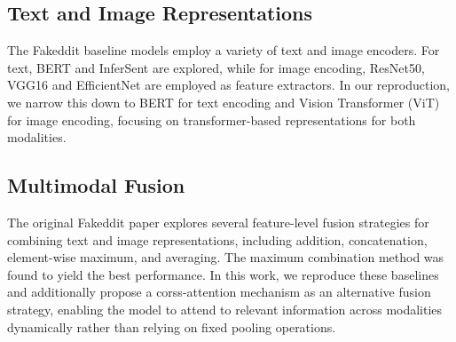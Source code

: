 \subsection{Text and Image Representations}

The Fakeddit baseline models employ a variety of text and image encoders. For text, BERT and InferSent are explored, while for image encoding, ResNet50, VGG16 and EfficientNet are employed as feature extractors. In our reproduction, we narrow this down to BERT \cite{bert} for text encoding and Vision Transformer (ViT) \cite{vit} for image encoding, focusing on transformer-based representations for both modalities.

\subsection{Multimodal Fusion}

The original Fakeddit paper explores several feature-level fusion strategies for combining text and image representations, including addition, concatenation, element-wise maximum, and averaging. The maximum combination method was found to yield the best performance. In this work, we reproduce these baselines and additionally propose a corss-attention mechanism as an alternative fusion strategy, enabling the model to attend to relevant information across modalities dynamically rather than relying on fixed pooling operations.